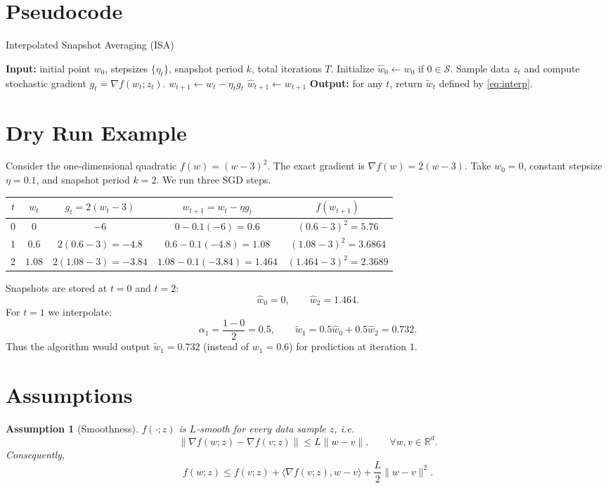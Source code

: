 \documentclass{article}
\newtheorem{assumption}{Assumption}
\newcommand{\RR}{\mathbb{R}}
\begin{document}
\section*{Pseudocode}
\begin{algorithm}[H]
\caption{Interpolated Snapshot Averaging (ISA)}
\begin{algorithmic}[1]
\State \textbf{Input:} initial point $w_0$, stepsizes $\{\eta_t\}$, snapshot period $k$, total iterations $T$.
\State Initialize $ \widehat w_{0}\gets w_0$ if $0\in\mathcal{S}$.
    \State Sample data $z_t$ and compute stochastic gradient $g_t=\nabla f(w_t;z_t)$.
    \State $w_{t+1}\gets w_t-\eta_t g_t$ \hfill{}
        \State $\widehat w_{t+1}\gets w_{t+1}$ \hfill{}
    \EndIf
\EndFor
\State \textbf{Output:} for any $t$, return $\widetilde w_t$ defined by \eqref{eq:interp}.
\end{algorithmic}
\end{algorithm}

\section*{Dry Run Example}
Consider the one‑dimensional quadratic $f(w)=(w-3)^2$.
The exact gradient is $\nabla f(w)=2(w-3)$.  
Take $w_0=0$, constant stepsize $\eta=0.1$, and snapshot period $k=2$.
We run three SGD steps.

\begin{center}
\begin{tabular}{c|c|c|c|c}
$t$ & $w_t$ & $g_t=2(w_t-3)$ & $w_{t+1}=w_t-\eta g_t$ & $f(w_{t+1})$\\ \hline
0 & $0$ & $-6$ & $0-0.1(-6)=0.6$ & $(0.6-3)^2=5.76$\\
1 & $0.6$ & $2(0.6-3)=-4.8$ & $0.6-0.1(-4.8)=1.08$ & $(1.08-3)^2=3.6864$\\
2 & $1.08$ & $2(1.08-3)=-3.84$ & $1.08-0.1(-3.84)=1.464$ & $(1.464-3)^2=2.3689$
\end{tabular}
\end{center}

Snapshots are stored at $t=0$ and $t=2$:
\[
\widehat w_{0}=0,\qquad \widehat w_{2}=1.464.
\]
For $t=1$ we interpolate:
\[
\alpha_1=\frac{1-0}{2}=0.5,\qquad 
\widetilde w_{1}=0.5\widehat w_{0}+0.5\widehat w_{2}=0.732 .
\]
Thus the algorithm would output $\widetilde w_{1}=0.732$ (instead of $w_{1}=0.6$) for prediction at iteration $1$.

\section*{Assumptions}
\begin{assumption}[Smoothness]
\label{ass:smooth}
$f(\cdot;z)$ is $L$‑smooth for every data sample $z$, i.e.
\[
\|\nabla f(w;z)-\nabla f(v;z)\|\le L\|w-v\|,\qquad\forall w,v\in\RR^{d}.
\]
Consequently,
\[
f(w;z)\le f(v;z)+\langle\nabla f(v;z),w-v\rangle+\frac{L}{2}\|w-v\|^{2}.
\]
\end{assumption}
\end{document}
